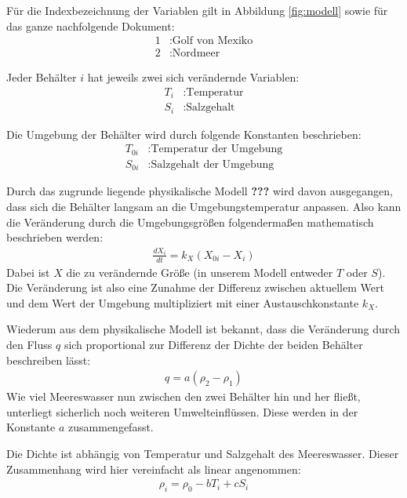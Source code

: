 \documentclass[a4paper,twoside]{article}
\begin{document}
	Für die Indexbezeichnung der Variablen gilt in Abbildung \ref{fig:modell} sowie für das ganze nachfolgende Dokument:
	\begin{align*}
		1 &: \textrm{Golf von Mexiko} \\
		2 &: \textrm{Nordmeer}
	\end{align*}

	Jeder Behälter \(i\) hat jeweils zwei sich verändernde Variablen:
	\begin{align*}
		T_i &: \textrm{Temperatur} \\
		S_i &: \textrm{Salzgehalt}
	\end{align*}
	
	Die Umgebung der Behälter wird durch folgende Konstanten beschrieben:
	\begin{align*}
		T_{0i} &: \textrm{Temperatur der Umgebung} \\
		S_{0i} &: \textrm{Salzgehalt der Umgebung}
	\end{align*}
	
	Durch das zugrunde liegende physikalische Modell \textbf{???} wird davon ausgegangen, dass sich die Behälter langsam an die Umgebungstemperatur anpassen. Also kann die Veränderung durch die Umgebungsgrößen folgendermaßen mathematisch beschrieben werden:
	\begin{align*}
		\frac{dX_i}{dt} = k_X \left( X_{0i} - X_i \right)
	\end{align*}
	Dabei ist \(X\) die zu verändernde Größe (in unserem Modell entweder \(T\) oder \(S\)).
	Die Veränderung ist also eine Zunahme der Differenz zwischen aktuellem Wert und dem Wert der Umgebung multipliziert mit einer Austauschkonstante \(k_X\).
	
	Wiederum aus dem physikalische Modell ist bekannt, dass die Veränderung durch den Fluss \(q\) sich proportional zur Differenz der Dichte der beiden Behälter beschreiben lässt:
	\begin{align*}
		q = a \left( \rho_2 - \rho_1 \right)
	\end{align*}
	Wie viel Meereswasser nun zwischen den zwei Behälter hin und her fließt, unterliegt sicherlich noch weiteren Umwelteinflüssen. Diese werden in der Konstante \(a\) zusammengefasst.
	
	Die Dichte ist abhängig von Temperatur und Salzgehalt des Meereswasser. Dieser Zusammenhang wird hier vereinfacht als linear angenommen:
	\begin{align*}
		\rho_i = \rho_0 - bT_i + cS_i
	\end{align*}
	
\end{document}
